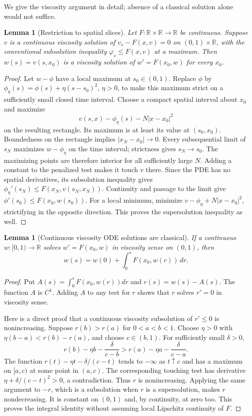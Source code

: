 \documentclass[11pt,a4paper]{article}
\newcommand{\R}{\mathbb R}
\newtheorem{lemma}[theorem]{Lemma}
\theoremstyle{definition}
\begin{document}
We give the viscosity argument in detail; absence of a classical solution alone would not suffice.

\begin{lemma}[Restriction to spatial slices]
Let $F:\R\times\R\to\R$ be continuous. Suppose $v$ is a continuous viscosity solution of
$v_s-F(x,v)=0$ on $(0,1)\times\R$, with the conventional subsolution inequality $\varphi_s\le F(x,v)$ at a maximum. Then $w(s)=v(s,x_0)$ is a viscosity solution of $w'=F(x_0,w)$ for every $x_0$.
\end{lemma}
\begin{proof}
Let $w-\phi$ have a local maximum at $s_0\in(0,1)$. Replace $\phi$ by $\phi_\eta(s)=\phi(s)+\eta(s-s_0)^2$, $\eta>0$, to make this maximum strict on a sufficiently small closed time interval. Choose a compact spatial interval about $x_0$ and maximize
\[
 v(s,x)-\phi_\eta(s)-N|x-x_0|^2
\]
on the resulting rectangle. Its maximum is at least its value at $(s_0,x_0)$. Boundedness on the rectangle implies $|x_N-x_0|\to0$. Every subsequential limit of $s_N$ maximizes $w-\phi_\eta$ on the time interval; strictness gives $s_N\to s_0$. The maximizing points are therefore interior for all sufficiently large $N$. Adding a constant to the penalized test makes it touch $v$ there. Since the PDE has no spatial derivatives, its subsolution inequality gives
$\phi_\eta'(s_N)\le F(x_N,v(s_N,x_N))$. Continuity and passage to the limit give $\phi'(s_0)\le F(x_0,w(s_0))$. For a local minimum, minimize $v-\phi_\eta+N|x-x_0|^2$, strictifying in the opposite direction. This proves the supersolution inequality as well.
\end{proof}

\begin{lemma}[Continuous viscosity ODE solutions are classical]
If a continuous $w:[0,1)\to\R$ solves $w'=F(x_0,w)$ in viscosity sense on $(0,1)$, then
\[
 w(s)=w(0)+\int_0^s F(x_0,w(r))\,dr.
\]
\end{lemma}
\begin{proof}
Put $A(s)=\int_0^s F(x_0,w(r))dr$ and $r(s)=w(s)-A(s)$. The function $A$ is $C^1$. Adding $A$ to any test for $r$ shows that $r$ solves $r'=0$ in viscosity sense.

Here is a direct proof that a continuous viscosity subsolution of $r'\le0$ is nonincreasing. Suppose $r(b)>r(a)$ for $0<a<b<1$. Choose $\eta>0$ with $\eta(b-a)<r(b)-r(a)$, and choose $c\in(b,1)$. For sufficiently small $\delta>0$,
\[
 r(b)-\eta b-\frac\delta{c-b}
 >r(a)-\eta a-\frac\delta{c-a}.
\]
The function $r(t)-\eta t-\delta/(c-t)$ tends to $-\infty$ as $t\uparrow c$ and has a maximum on $[a,c)$ at some point in $(a,c)$. The corresponding touching test has derivative $\eta+\delta/(c-t)^2>0$, a contradiction. Thus $r$ is nonincreasing. Applying the same argument to $-r$, which is a subsolution when $r$ is a supersolution, makes $r$ nondecreasing. It is constant on $(0,1)$ and, by continuity, at zero too. This proves the integral identity without assuming local Lipschitz continuity of $F$.
\end{proof}
\end{document}
